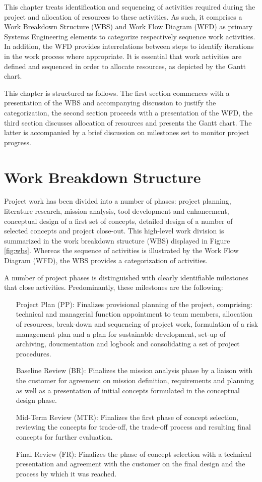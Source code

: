 This chapter treats identification and sequencing of activities required during the project and allocation of resources to these activities. As such, it comprises a Work Breakdown Structure (WBS) and Work Flow Diagram (WFD) as primary Systems Engineering elements to categorize respectively sequence work activities. In addition, the WFD provides interrelations between steps to identify iterations in the work process where appropriate. It is essential that work activities are defined and sequenced in order to allocate resources, as depicted by the Gantt chart.

This chapter is structured as follows. The first section commences with a presentation of the WBS and accompanying discussion to justify the categorization, the second section proceeds with a presentation of the WFD, the third section discusses allocation of resources and presents the Gantt chart. The latter is accompanied by a brief discussion on milestones set to monitor project progress.

\section{Work Breakdown Structure}\label{cha:WBS}
Project work has been divided into a number of phases: project planning, literature research, mission analysis, tool development and enhancement, conceptual design of a first set of concepts, detailed design of a number of selected concepts and project close-out. This high-level work division is summarized in the work breakdown structure (WBS) displayed in Figure \ref{fig:wbs}. Whereas the sequence of activities is illustrated by the Work Flow Diagram (WFD), the WBS provides a categorization of activities. 




A number of project phases is distinguished with clearly identifiable milestones that close activities. Predominantly, these milestones are the following:
\begin{itemize}
\item[Project Plan (PP):] Finalizes provisional planning of the project, comprising: technical and managerial function appointment to team members, allocation of resources, break-down and sequencing of project work, formulation of a risk management plan and a plan for sustainable development, set-up of archiving, doucmentation and logbook and consolidating a set of project procedures.
\item[Baseline Review (BR):] Finalizes the mission analysis phase by a liaison with the customer for agreement on mission definition, requirements and planning as well as a presentation of initial concepts formulated in the conceptual design phase.
\item[Mid-Term Review (MTR):] Finalizes the first phase of concept selection, reviewing the concepts for trade-off, the trade-off process and resulting final concepts for further evaluation.
\item[Final Review (FR):] Finalizes the phase of concept selection with a technical presentation and agreement with the customer on the final design and the process by which it was reached. 
\end{itemize}

